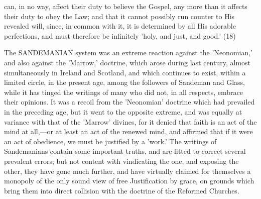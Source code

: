 \documentclass[
]{book}
\begin{document}
can, in no way, affect their duty to believe the Gospel, any more than it affects their duty to obey the Law; and that it cannot possibly run counter to His revealed will, since, in common with it, it is determined by all His adorable perfections, and must therefore be infinitely 'holy, and just, and good.' (18)

The SANDEMANIAN system was an extreme reaction against the 'Neonomian,' and also against the 'Marrow,' doctrine, which arose during last century, almost simultaneously in Ireland and Scotland, and which continues to exist, within a limited circle, in the present age, among the followers of Sandeman and Glass, while it has tinged the writings of many who did not, in all respects, embrace their opinions. It was a recoil from the 'Neonomian' doctrine which had prevailed in the preceding age, but it went to the opposite extreme, and was equally at variance with that of the 'Marrow' divines, for it denied that faith is an act of the mind at all,---or at least an act of the renewed mind, and affirmed that if it were an act of obedience, we must be justified by a 'work.' The writings of Sandemanians contain some important truths, and are fitted to correct several prevalent errors; but not content with vindicating the one, and exposing the other, they have gone much further, and have virtually claimed for themselves a monopoly of the only sound view of free Justification by grace, on grounds which bring them into direct collision with the doctrine of the Reformed Churches.
\end{document}
